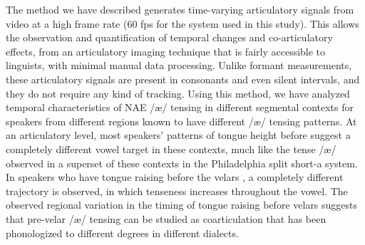 \documentclass[output=paper]{LSP/langsci}
\begin{document}
The method we have described generates time-varying articulatory signals from  video at a high frame rate (60 fps for the system used in this study). This allows the observation and quantification of temporal changes and co-articulatory effects, from an articulatory imaging technique that is fairly accessible to linguists, with minimal manual data processing.  Unlike formant measurements, these articulatory signals are present in consonants and even silent intervals, and they do not require any kind of tracking.  Using this method, we have analyzed temporal characteristics of NAE /æ/ tensing in different segmental contexts for speakers from different regions known to have different /æ/ tensing patterns. At an articulatory level, most speakers' patterns of tongue height before  suggest a completely different vowel target in these contexts, much like the tense /æ/ observed in a superset of these contexts in the Philadelphia split short-a system.  In speakers who have tongue raising before the velars {}, a completely different trajectory is observed, in which tenseness increases throughout the vowel.  The observed regional variation in the timing of tongue raising before velars suggests that pre-velar /æ/ tensing can be studied as coarticulation that has been phonologized to different degrees in different dialects.
\printbibliography[heading=subbibliography,notkeyword=this]
\end{document}

